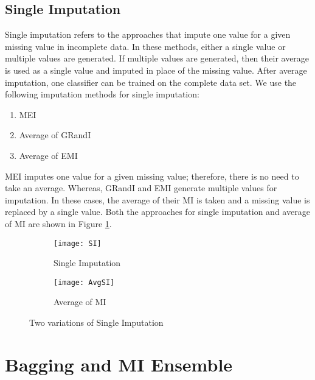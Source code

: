 \documentclass{iosart2c}
\begin{document}
\subsection{Single Imputation}
\label{sec:imputation}
Single imputation refers to the approaches that impute one value for a given missing value in incomplete data. 
In these methods, either a single value or multiple values are generated. If multiple values are generated, then their average is used as a single value and imputed in place of the missing value. After average imputation, one classifier can be trained on the complete data set. 
We use the following imputation methods for single imputation:

\begin{enumerate}
    \item MEI
    \item Average of GRandI
    \item Average of EMI 
\end{enumerate}

MEI imputes one value for a given missing value; therefore, there is no need to take an average. 
Whereas, GRandI and EMI generate multiple values for imputation. In these cases, the average of their MI is taken and a missing value is replaced by a single value. Both the approaches for single imputation and average of MI are shown in Figure \ref{fig:si}.

\begin{figure}[htb]
\centering
    \begin{subfigure}{0.23\textwidth}
  \centering
  \texttt{[image: SI]} 
  \caption{Single Imputation} 
  \end{subfigure}
  \begin{subfigure}{0.23\textwidth}
  \centering
  \texttt{[image: AvgSI]} 
  \caption{Average of MI} 
  \end{subfigure}
  \caption{Two variations of Single Imputation}
  \label{fig:si}
\end{figure}

\section{Bagging and MI Ensemble}
\label{sec:bmi}
\end{document}
